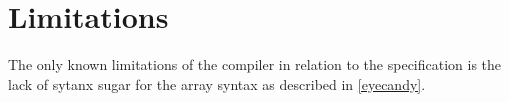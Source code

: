 \section{Limitations}

The only known limitations of the compiler in relation to the
specification is the lack of sytanx sugar for the array syntax
as described in \ref{eyecandy}.
